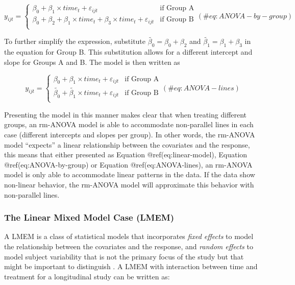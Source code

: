 \documentclass[Royal,times,sagev]{sagej}
\begin{document}
\begin{equation}
y_{ijt} = \begin{cases}
\beta_0 + \beta_1\times time_{t}+\varepsilon_{ijt}   & \mbox{if Group A}\\
\beta_0 + \beta_2+\beta_1 \times time_{t} +\beta_3 \times time_{t}+\varepsilon_{ijt}  & \mbox{if Group B}\\
\end{cases}
(\#eq:ANOVA-by-group)
\end{equation}

To further simplify the expression, substitute
\(\widetilde{\beta_{0}}=\beta_0+\beta_{2}\) and
\(\widetilde{\beta_{1}}=\beta_{1}+\beta_{3}\) in the equation for Group
B. This substitution allows for a different intercept and slope for
Groups A and B. The model is then written as

\begin{equation}
y_{ijt} = \begin{cases}
\beta_0 + \beta_1\times time_{t}+\varepsilon_{ijt}   & \mbox{if Group A}\\
\widetilde{\beta_{0}} + \widetilde{\beta_1} \times time_{t}+\varepsilon_{ijt}  & \mbox{if Group B}\\
\end{cases}
(\#eq:ANOVA-lines)
\end{equation}

Presenting the model in this manner makes clear that when treating
different groups, an rm-ANOVA model is able to accommodate non-parallel
lines in each case (different intercepts and slopes per group). In other
words, the rm-ANOVA model ``expects'' a linear relationship between the
covariates and the response, this means that either presented as
Equation @ref(eq:linear-model), Equation @ref(eq:ANOVA-by-group) or
Equation @ref(eq:ANOVA-lines), an rm-ANOVA model is only able to
accommodate linear patterns in the data. If the data show non-linear
behavior, the rm-ANOVA model will approximate this behavior with
non-parallel lines.

\hypertarget{the-linear-mixed-model-case-lmem}{%
\subsubsection{The Linear Mixed Model Case
(LMEM)}\label{the-linear-mixed-model-case-lmem}}

A LMEM is a class of statistical models that incorporates \emph{fixed
effects} to model the relationship between the covariates and the
response, and \emph{random effects} to model subject variability that is
not the primary focus of the study but that might be important to
distinguish \citep{pinheiro2006, west2014}. A LMEM with interaction
between time and treatment for a longitudinal study can be written as:
\end{document}
